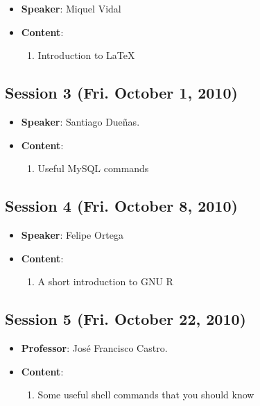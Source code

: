 \documentclass[a4paper]{article}
\begin{document}
\begin{itemize}
 \item \textbf{Speaker}: Miquel Vidal

 \item \textbf{Content}:

  \begin{enumerate}
   \item Introduction to LaTeX
  \end{enumerate}

\end{itemize}

\subsection{Session 3 (Fri. October 1, 2010)}

  \begin{itemize}
   \item \textbf{Speaker}: Santiago Dueñas.

   \item \textbf{Content}:

   \begin{enumerate}
    \item Useful MySQL commands
   \end{enumerate}

  \end{itemize}

\subsection{Session 4 (Fri. October 8, 2010)}

\begin{itemize}
 \item \textbf{Speaker}: Felipe Ortega

  \item \textbf{Content}:

  \begin{enumerate}
   \item A short introduction to GNU R
  \end{enumerate}

\end{itemize}

\subsection{Session 5 (Fri. October 22, 2010)}

\begin{itemize}
 \item \textbf{Professor}: José Francisco Castro.

 \item \textbf{Content}:

 \begin{enumerate}
  \item Some useful shell commands that you should know
 \end{enumerate}

\end{itemize}
\end{document}
